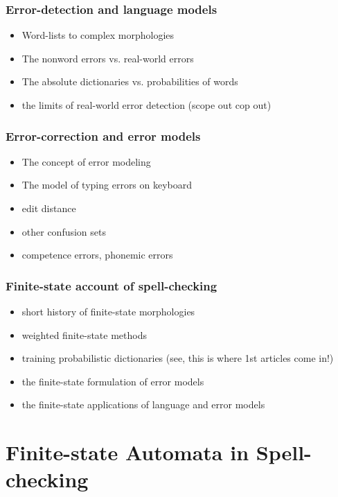 \documentclass[officiallayout]{unihelcompling}
\begin{document}
\subsection{Error-detection and language models}

\begin{itemize}
    \item Word-lists to complex morphologies
    \item The nonword errors vs. real-world errors
    \item The absolute dictionaries vs. probabilities of words
    \item the limits of real-world error detection (scope out cop out)
\end{itemize}


\subsection{Error-correction and error models}

\begin{itemize}
    \item The concept of error modeling
    \item The model of typing errors on keyboard
    \item edit distance
    \item other confusion sets
    \item competence errors, phonemic errors
\end{itemize}

\subsection{Finite-state account of spell-checking}

\begin{itemize}
    \item short history of finite-state morphologies
    \item weighted finite-state methods
    \item training probabilistic dictionaries (see, this is where 1st articles
        come in!)
    \item the finite-state formulation of error models
    \item the finite-state applications of language and error models
\end{itemize}

\chapter{Finite-state Automata in Spell-checking}
\end{document}
